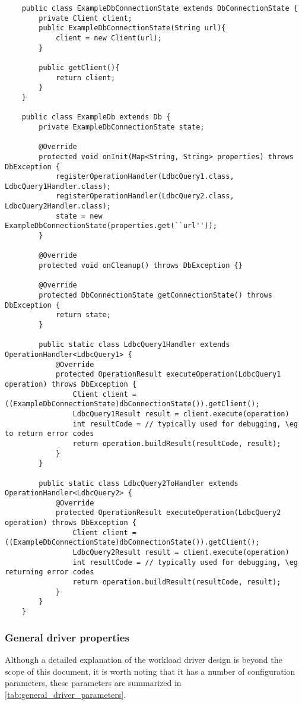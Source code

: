 {\footnotesize
	\begin{verbatim}
    public class ExampleDbConnectionState extends DbConnectionState {
        private Client client;
        public ExampleDbConnectionState(String url){
            client = new Client(url);
        }

        public getClient(){
            return client;
        }
    }

    public class ExampleDb extends Db {
        private ExampleDbConnectionState state;

        @Override
        protected void onInit(Map<String, String> properties) throws DbException {
            registerOperationHandler(LdbcQuery1.class, LdbcQuery1Handler.class);
            registerOperationHandler(LdbcQuery2.class, LdbcQuery2Handler.class);
            state = new ExampleDbConnectionState(properties.get(``url''));
        }

        @Override
        protected void onCleanup() throws DbException {}

        @Override
        protected DbConnectionState getConnectionState() throws DbException {
            return state;
        }

        public static class LdbcQuery1Handler extends OperationHandler<LdbcQuery1> {
            @Override
            protected OperationResult executeOperation(LdbcQuery1 operation) throws DbException {
                Client client = ((ExampleDbConnectionState)dbConnectionState()).getClient();
                LdbcQuery1Result result = client.execute(operation)
                int resultCode = // typically used for debugging, \eg to return error codes
                return operation.buildResult(resultCode, result);
            }
        }

        public static class LdbcQuery2ToHandler extends OperationHandler<LdbcQuery2> {
            @Override
            protected OperationResult executeOperation(LdbcQuery2 operation) throws DbException {
                Client client = ((ExampleDbConnectionState)dbConnectionState()).getClient();
                LdbcQuery2Result result = client.execute(operation)
                int resultCode = // typically used for debugging, \eg returning error codes
                return operation.buildResult(resultCode, result);
            }
        }
    }
	\end{verbatim}
}

\subsubsection{General driver properties}
\label{ssub:general_driver_properties}
Although a detailed explanation of the workload driver design is beyond the
scope of this document, it is worth noting that it has a number of
configuration parameters, these parameters are summarized in
\autoref{tab:general_driver_parameters}.

